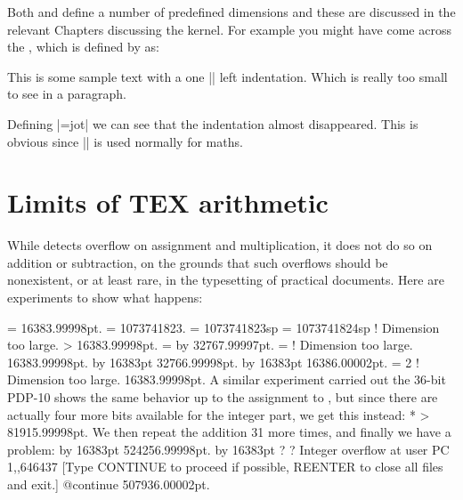 Both \tex and \latex define a number of predefined dimensions and these are discussed in the relevant Chapters discussing the \latex kernel. For example you might have come across the , which is defined by \latex as:

\begin{teXX}
\newdimen\jot
This is some sample text with a one |\jot| left indentation. Which is really too small to see in a paragraph.
\jot=3pt
\end{teXX}

Defining |\parindent=jot| we can see that the indentation almost disappeared. This is obvious since |\jot| is used normally for maths.


 


\section{Limits of TEX arithmetic}

While \tex detects overflow on assignment and multiplication, it does not
do so on addition or subtraction, on the grounds that such overflows should
be nonexistent, or at least rare, in the typesetting of practical documents.
Here are experiments to show what happens:

\small
\begin{teX}
 = \maxdimen %
\showthe {}
16383.99998pt.
 =  %
\showthe {}
1073741823.
 = 1073741823sp %
 = 1073741824sp %
! Dimension too large.
\showthe {} %
> 16383.99998pt.
 = 
\advance {} by  %
\showthe {} %
32767.99997pt.
 =  %
! Dimension too large.
\showthe {} %
16383.99998pt.
\advance {} by 16383pt %
\showthe {} %
32766.99998pt.
\advance {} by 16383pt %
\showthe {} %
16386.00002pt.
 = 2 %
! Dimension too large.
\showthe {} %
16383.99998pt.
A similar experiment carried out the 36-bit PDP-10 shows the same behavior
up to the assignment to , but since there are actually four
more bits available for the integer part, we get this instead:
*\showthe {}
> 81915.99998pt.
We then repeat the addition 31 more times, and finally we have a problem:
\advance {} by 16383pt \showthe {} %
524256.99998pt.
\advance {} by 16383pt \showthe {} %
?
? Integer overflow at user PC 1,,646437
[Type CONTINUE to proceed if possible,
REENTER to close all files and exit.]
@continue
507936.00002pt.
\end{teX}
\normalsize



